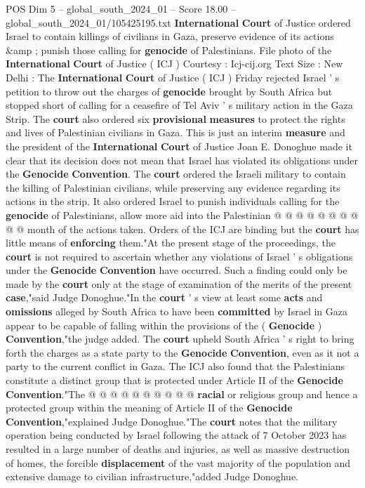\begin{textsample}{POS Dim 5 – global\_south\_2024\_01 – Score 18.00 – global\_south\_2024\_01/105425195.txt}  \label{ex:f5_pos_015}
\textbf{International} \textbf{Court} of Justice ordered Israel to contain killings of civilians in Gaza, preserve evidence of its actions \&amp ; punish those calling for \textbf{genocide} of Palestinians.
File photo of the \textbf{International} \textbf{Court} of Justice ( ICJ ) Courtesy : Icj-cij.org Text Size : New Delhi : The \textbf{International} \textbf{Court} of Justice ( ICJ ) Friday rejected Israel ' s petition to throw out the charges of \textbf{genocide} brought by South Africa but stopped short of calling for a ceasefire of Tel Aviv ' s military action in the Gaza Strip.
The \textbf{court} also ordered six \textbf{provisional} \textbf{measures} to protect the rights and lives of Palestinian civilians in Gaza.
This is just an interim \textbf{measure} and the president of the \textbf{International} \textbf{Court} of Justice Joan E.
Donoghue made it clear that its decision does not mean that Israel has violated its obligations under the \textbf{Genocide} \textbf{Convention}.
The \textbf{court} ordered the Israeli military to contain the killing of Palestinian civilians, while preserving any evidence regarding its actions in the strip.
It also ordered Israel to punish individuals calling for the \textbf{genocide} of Palestinians, allow more aid into the Palestinian @ @ @ @ @ @ @ @ @ @ month of the actions taken.
Orders of the ICJ are binding but the \textbf{court} has little means of \textbf{enforcing} them."At the present stage of the proceedings, the \textbf{court} is not required to ascertain whether any violations of Israel ' s obligations under the \textbf{Genocide} \textbf{Convention} have occurred.
Such a finding could only be made by the \textbf{court} only at the stage of examination of the merits of the present \textbf{case},"said Judge Donoghue."In the \textbf{court} ' s view at least some \textbf{acts} and \textbf{omissions} alleged by South Africa to have been \textbf{committed} by Israel in Gaza appear to be capable of falling within the provisions of the ( \textbf{Genocide} ) \textbf{Convention},"the judge added.
The \textbf{court} upheld South Africa ' s right to bring forth the charges as a state party to the \textbf{Genocide} \textbf{Convention}, even as it not a party to the current conflict in Gaza.
The ICJ also found that the Palestinians constitute a distinct group that is protected under Article II of the \textbf{Genocide} \textbf{Convention}."The @ @ @ @ @ @ @ @ @ @ \textbf{racial} or religious group and hence a protected group within the meaning of Article II of the \textbf{Genocide} \textbf{Convention},"explained Judge Donoghue."The \textbf{court} notes that the military operation being conducted by Israel following the attack of 7 October 2023 has resulted in a large number of deaths and injuries, as well as massive destruction of homes, the forcible \textbf{displacement} of the vast majority of the population and extensive damage to civilian infrastructure,"added Judge Donoghue.

\end{textsample}
